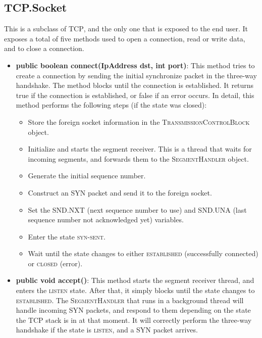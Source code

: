 \documentclass{hitec}
\newcommand{\classname}[1]{\textsc{#1}}
\newcommand{\state}[1]{\textsc{#1}}
\begin{document}
\begin{itemize}
\end{itemize}

\subsection{TCP.Socket}
This is a subclass of \classname{TCP}, and the only one that is exposed to the end user. It exposes a total of five methods used to open a connection, read or write data, and to close a connection.

\begin{itemize}
 \item \textbf{public boolean connect(IpAddress dst, int port)}: This method tries to create a connection by sending the initial synchronize packet in the three-way handshake. The method blocks until the connection is established. It returns true if the connection is established, or false if an error occurs. In detail, this method performs the following steps (if the state was closed):
 
  \begin{itemize}
    \item Store the foreign socket information in the \classname{TransmissionControlBlock} object.
    \item Initialize and starts the segment receiver. This is a thread that waits for incoming segments, and forwards them to the \classname{SegmentHandler} object.
    \item Generate the initial sequence number.
    \item Construct an SYN packet and send it to the foreign socket.
    \item Set the SND.NXT (next sequence number to use) and SND.UNA (last sequence number not acknowledged yet) variables.
    \item Enter the state \state{syn-sent}.
    \item Wait until the state changes to either \state{established} (successfully connected) or \state{closed} (error).
  \end{itemize}

   \item \textbf{public void accept()}: This method starts the segment receiver thread, and enters the \state{listen} state. After that, it simply blocks until the state changes to \state{established}. The \classname{SegmentHandler} that runs in a background thread will handle incoming SYN packets, and respond to them depending on the state the TCP stack is in at that moment. It will correctly perform the three-way handshake if the state is \state{listen}, and a SYN packet arrives.
   

\end{itemize}
\end{document}
